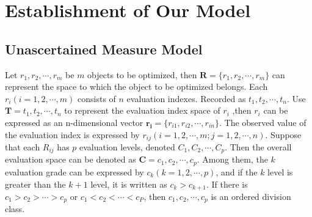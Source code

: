 \documentclass[12pt]{article}  %
\begin{document}
\section{Establishment of Our Model}
\subsection{Unascertained Measure Model}
Let $r_1,r_2,\cdots ,r_m$ be $m$ objects to be optimized, then $\bm{R}=\{r_1,r_2,\cdots ,r_m\}$ can represent the space to which the object to be optimized belongs.
Each $r_i(i = 1,2,\cdots ,m)$ consists of $n$ evaluation indexes. Recorded as $t_1, t_2,\cdots ,t_n$. 
Use $\bm{T}=t_1, t_2,\cdots ,t_n$ to represent the evaluation index space of $r_i$ ,then $r_i$ can be expressed as an n-dimensional vector $\bm{r_i}=\{r_{i1},r_{i2},\cdots ,r_{in}\}$. 
The observed value of the evaluation index is expressed by $r_{ij}(i=1,2,\cdots , m; j=1,2,\cdots ,n)$. 
Suppose that each $R_{ij}$ has $p$ evaluation levels, denoted $C_1,C_2,\cdots ,C_p$. 
Then the overall evaluation space can be denoted as $\bm{C}={c_1,c_2,\cdots ,c_p}$. 
Among them, the $k$ evaluation grade can be expressed by $c_k(k=1,2,\cdots ,p)$, and if the $k$ level is greater than the $k+1$ level, it is written as $c_k>c_{k+1}$.
If there is $c_1>c_2>\cdots >c_p$ or $c_1<c_2<\cdots <c_P$, then $c_1, c_2,\cdots ,c_p$ is an ordered division class.
\end{document}
